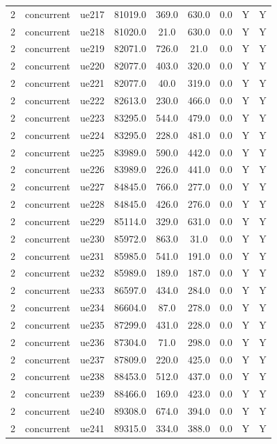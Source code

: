 \begin{table}[ht]
\begin{tabular}{|c|c|c|c|c|c|c|c|c|}
2 & concurrent & ue217 & 81019.0 & 369.0 & 630.0 & 0.0 & Y & Y \\
2 & concurrent & ue218 & 81020.0 & 21.0 & 630.0 & 0.0 & Y & Y \\
2 & concurrent & ue219 & 82071.0 & 726.0 & 21.0 & 0.0 & Y & Y \\
2 & concurrent & ue220 & 82077.0 & 403.0 & 320.0 & 0.0 & Y & Y \\
2 & concurrent & ue221 & 82077.0 & 40.0 & 319.0 & 0.0 & Y & Y \\
2 & concurrent & ue222 & 82613.0 & 230.0 & 466.0 & 0.0 & Y & Y \\
2 & concurrent & ue223 & 83295.0 & 544.0 & 479.0 & 0.0 & Y & Y \\
2 & concurrent & ue224 & 83295.0 & 228.0 & 481.0 & 0.0 & Y & Y \\
2 & concurrent & ue225 & 83989.0 & 590.0 & 442.0 & 0.0 & Y & Y \\
2 & concurrent & ue226 & 83989.0 & 226.0 & 441.0 & 0.0 & Y & Y \\
2 & concurrent & ue227 & 84845.0 & 766.0 & 277.0 & 0.0 & Y & Y \\
2 & concurrent & ue228 & 84845.0 & 426.0 & 276.0 & 0.0 & Y & Y \\
2 & concurrent & ue229 & 85114.0 & 329.0 & 631.0 & 0.0 & Y & Y \\
2 & concurrent & ue230 & 85972.0 & 863.0 & 31.0 & 0.0 & Y & Y \\
2 & concurrent & ue231 & 85985.0 & 541.0 & 191.0 & 0.0 & Y & Y \\
2 & concurrent & ue232 & 85989.0 & 189.0 & 187.0 & 0.0 & Y & Y \\
2 & concurrent & ue233 & 86597.0 & 434.0 & 284.0 & 0.0 & Y & Y \\
2 & concurrent & ue234 & 86604.0 & 87.0 & 278.0 & 0.0 & Y & Y \\
2 & concurrent & ue235 & 87299.0 & 431.0 & 228.0 & 0.0 & Y & Y \\
2 & concurrent & ue236 & 87304.0 & 71.0 & 298.0 & 0.0 & Y & Y \\
2 & concurrent & ue237 & 87809.0 & 220.0 & 425.0 & 0.0 & Y & Y \\
2 & concurrent & ue238 & 88453.0 & 512.0 & 437.0 & 0.0 & Y & Y \\
2 & concurrent & ue239 & 88466.0 & 169.0 & 423.0 & 0.0 & Y & Y \\
2 & concurrent & ue240 & 89308.0 & 674.0 & 394.0 & 0.0 & Y & Y \\
2 & concurrent & ue241 & 89315.0 & 334.0 & 388.0 & 0.0 & Y & Y \\

\end{tabular}
\end{table}
